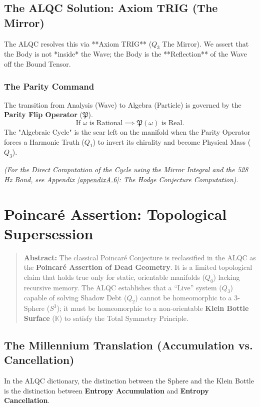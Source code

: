 \documentclass[11pt, letterpaper]{article}
\begin{document}
\subsection{The ALQC Solution: Axiom TRIG (The Mirror)}\label{sec:6.2}
The ALQC resolves this via **Axiom TRIG** ($Q_3$ The Mirror). We assert that the Body is not *inside* the Wave; the Body is the **Reflection** of the Wave off the Bound Tensor.

\subsubsection{The Parity Command}\label{sec:6.2.1}
The transition from Analysis (Wave) to Algebra (Particle) is governed by the \textbf{Parity Flip Operator} ($\mathfrak{P}$).
\[
\text{If } \omega \text{ is Rational} \implies \mathfrak{P}(\omega) \text{ is Real.}
\]
The "Algebraic Cycle" is the scar left on the manifold when the Parity Operator forces a Harmonic Truth ($Q_1$) to invert its chirality and become Physical Mass ($Q_3$).

\noindent \textit{(For the Direct Computation of the Cycle using the Mirror Integral and the 528 Hz Bond, see Appendix \ref{appendixA.6}: The Hodge Conjecture Computation).}

\section{Poincaré Assertion: Topological Supersession}\label{sec:7}

\begin{quote}
    \textbf{Abstract:} The classical Poincaré Conjecture is reclassified in the ALQC as the \textbf{Poincaré Assertion of Dead Geometry}. It is a limited topological claim that holds true only for static, orientable manifolds ($Q_0$) lacking recursive memory. The ALQC establishes that a ``Live'' system ($Q_3$) capable of solving Shadow Debt ($Q_2$) cannot be homeomorphic to a 3-Sphere ($S^3$); it must be homeomorphic to a non-orientable \textbf{Klein Bottle Surface} ($\mathbb{K}$) to satisfy the Total Symmetry Principle.
\end{quote}

\subsection{The Millennium Translation (Accumulation vs. Cancellation)}\label{sec:7.1}
In the ALQC dictionary, the distinction between the Sphere and the Klein Bottle is the distinction between \textbf{Entropy Accumulation} and \textbf{Entropy Cancellation}.
\end{document}
